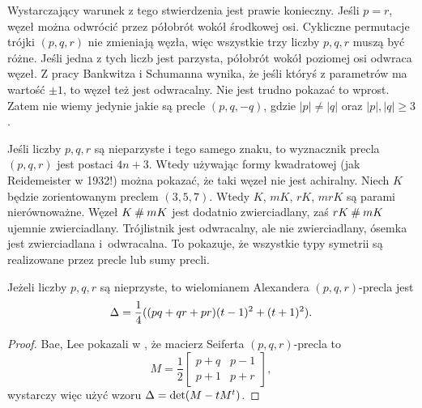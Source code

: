 Wystarczający warunek z tego stwierdzenia jest prawie konieczny.
Jeśli $p = r$, węzeł można odwrócić przez półobrót wokół środkowej osi.
Cykliczne permutacje trójki $(p, q, r)$ nie zmieniają węzła, więc wszystkie trzy liczby $p, q, r$ muszą być różne.
Jeśli jedna z tych liczb jest parzysta, półobrót wokół poziomej osi odwraca węzeł.
Z pracy Bankwitza i Schumanna wynika, że jeśli któryś z parametrów ma wartość $\pm 1$, to węzeł też jest odwracalny.
%
%
Nie jest trudno pokazać to wprost.
Zatem nie wiemy jedynie jakie są precle $(p, q, -q)$, gdzie $|p| \neq |q|$ oraz $|p|, |q| \ge 3$.

Jeśli liczby $p, q, r$ są nieparzyste i tego samego znaku, to wyznacznik precla $(p, q, r)$ jest postaci $4n+3$.
%
Wtedy używając formy kwadratowej (jak Reidemeister w 1932!) można pokazać, że taki węzeł nie jest achiralny.
Niech $K$ będzie zorientowanym preclem $(3, 5, 7)$.
Wtedy $K$, $mK$, $rK$, $mrK$ są parami nierównoważne.
Węzeł $K \mathbin{\#} mK$ jest dodatnio zwierciadlany, zaś $rK \mathbin{\#} mK$ ujemnie zwierciadlany.
Trójlistnik jest odwracalny, ale nie zwierciadlany, ósemka jest zwierciadlana i~odwracalna.
To pokazuje, że wszystkie typy symetrii są realizowane przez precle lub sumy precli.

\begin{proposition}
\label{prp:pretzel_alexander}%
%
    Jeżeli liczby $p, q, r$ są nieprzyste, to wielomianem Alexandera $(p, q, r)$-precla jest
    \begin{equation}
        \Delta = \frac 14 ((pq+qr+pr) (t-1)^2 + (t+1)^2).
    \end{equation}
\end{proposition}

\begin{proof}
%
%
    Bae, Lee pokazali w \cite[lemat 3.1]{bae20}, że macierz Seiferta $(p, q, r)$-precla to
    \begin{equation}
        M = \frac 1 2 \begin{bmatrix}
            p+q & p-1 \\
            p+1 & p+r
        \end{bmatrix},
    \end{equation}
    wystarczy więc użyć wzoru $\Delta = \det(M-tM^t)$.
\end{proof}

